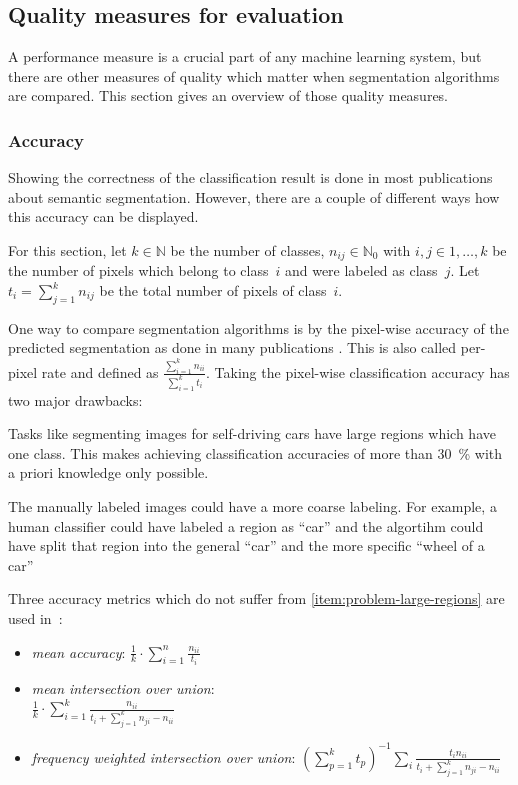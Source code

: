 \subsection{Quality measures for evaluation}%
\label{subsec:quality-measures}%
A performance measure is a crucial part of any machine learning system, but
there are other measures of quality which matter when segmentation algorithms
are compared. This section gives an overview of those quality measures.


\subsubsection{Accuracy}
Showing the correctness of the classification result is done in most
publications about semantic segmentation. However, there are a couple of
different ways how this accuracy can be displayed.

For this section, let $k \in \mathbb{N}$ be the number of classes, $n_{ij} \in
\mathbb{N}_0$ with $i,j \in 1, \dots, k$ be the number of pixels which belong to
class~$i$ and were labeled as class~$j$. Let $t_i = \sum_{j=1}^k n_{ij}$ be the
total number of pixels of class~$i$.

One way to compare segmentation algorithms is by the pixel-wise accuracy of the
predicted segmentation as done in many publications
\cite{shotton2006textonboost,csurka2008simple,long2014fully}. This is also
called per-pixel rate and defined as $\frac{\sum_{i=1}^k n_{ii}}{\sum_{i=1}^k
t_i}$. Taking the pixel-wise classification accuracy has two major drawbacks:

\begin{problemnr}
    \item \label{item:problem-large-regions} Tasks like segmenting images for self-driving cars have large regions
          which have one class. This makes achieving classification accuracies
          of more than \SI{30}{\percent} with a priori knowledge only possible.
    \item The manually labeled images could have a more coarse labeling. For
          example, a human classifier could have labeled a region as
          \enquote{car} and the algortihm could have split that region into
          the general \enquote{car} and the more specific \enquote{wheel of a
          car}
\end{problemnr}
\goodbreak
Three accuracy metrics which do not suffer from
\cref{item:problem-large-regions} are used in~\cite{long2014fully}:\nobreak%
\begin{itemize}
    \item \textit{mean accuracy}: $\frac{1}{k} \cdot \sum_{i=1}^n \frac{n_{ii}}{t_i}$
    \item \textit{mean intersection over union}: \hfill\\$\frac{1}{k} \cdot \sum_{i=1}^k \frac{n_{ii}}{t_i + \sum_{j=1}^k n_{ji}-n_{ii}}$
    \item \textit{frequency weighted intersection over union}:
          ${({\sum_{p=1}^k t_p})}^{-1} \sum_i \frac{t_i n_{ii}}{t_i + \sum_{j=1}^k n_{ji} - n_{ii}}$
\end{itemize}

